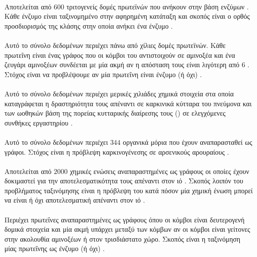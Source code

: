 \paragraph*{} Αποτελείται από $600$ τριτογενείς δομές πρωτεϊνών που ανήκουν στην βάση ενζύμων .
Κάθε ένζυμο είναι ταξινομημένο στην αφηρημένη κατάταξη  και σκοπός είναι ο ορθός προσδιορισμός της κλάσης στην οποία ανήκει ένα ένζυμο \cite{Borgwardt2005}.

\paragraph*{} Αυτό το σύνολο δεδομένων περιέχει πάνω από χίλιες δομές πρωτεϊνών.
Κάθε πρωτεΐνη είναι ένας γράφος που οι κόμβοι του αντιστοιχούν σε αμινοξέα και ένα ζευγάρι αμινοξέων συνδέεται με μία ακμή αν η απόσταση τους είναι λιγότερη από 6 .
Στόχος είναι να προβλέψουμε αν μία πρωτεΐνη είναι ένζυμο (ή όχι) \cite{DobsonDoig03, shervashidze2011weisfeiler}.

\paragraph*{} Αυτό το σύνολο δεδομένων περιέχει μερικές χιλιάδες χημικά στοιχεία στα οποία καταγράφεται η δραστηριότητα τους απέναντι σε καρκινικά κύτταρα του πνεύμονα και των ωοθηκών βάση της πορείας κυτταρικής διαίρεσης τους () σε ελεγχόμενες συνθήκες εργαστηρίου \cite{Wale2008}.

\paragraph*{} Αυτό το σύνολο δεδομένων περιέχει $344$ οργανικά μόρια που έχουν αναπαρασταθεί ως γράφοι.
Στόχος είναι η πρόβλεψη καρκινογένεσης σε αρσενικούς αρουραίους \cite{Toivonen2003}.

\paragraph*{} Αποτελείται από $2000$ χημικές ενώσεις αναπαραστημένες ως γράφους οι οποίες έχουν δοκιμαστεί για την αποτελεσματικότητα τους απέναντι στον ιό . Σκοπός λοιπόν του προβλήματος ταξινόμησης είναι η πρόβλεψη του κατά πόσον μία χημική ένωση μπορεί να είναι ή όχι αποτελεσματική απέναντι στον ιό \cite{Riesen08}.

\paragraph*{} Περιέχει πρωτεΐνες αναπαραστημένες ως γράφους όπου οι κόμβοι είναι δευτερογενή δομικά στοιχεία και μία ακμή υπάρχει μεταξύ των κόμβων αν οι κόμβοι είναι γείτονες στην ακολουθία αμινοξέων ή στον τρισδιάστατο χώρο.
Σκοπός είναι η ταξινόμηση μίας πρωτεΐνης ως ένζυμο (ή όχι) \cite{borgwardt2005protein}.

